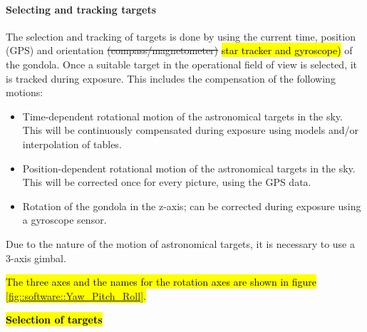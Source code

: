 \paragraph{Selecting and tracking targets}

The selection and tracking of targets is done by using the current time, position (GPS) and orientation \st{(compass/magnetometer)} \hl{star tracker and gyroscope)}
of the gondola. Once a suitable target in the operational field of view is selected, it is tracked during exposure. This includes the compensation of the following motions:
\begin{itemize}
	\item Time-dependent rotational motion of the astronomical targets in the sky. This will be continuously compensated during exposure using models and/or interpolation of tables.
	\item Position-dependent rotational motion of the astronomical targets in the sky. This will be corrected once for every picture, using the GPS data.
	\item Rotation of the gondola in the z-axis; can be corrected during exposure using a gyroscope sensor.
\end{itemize}

Due to the nature of the motion of astronomical targets, it is necessary to use a 3-axis gimbal.

\hl{The three axes and the names for the rotation axes are shown in figure \mbox{\ref{fig::software::Yaw_Pitch_Roll}}.}

\textbf{\hl{Selection of targets}}

